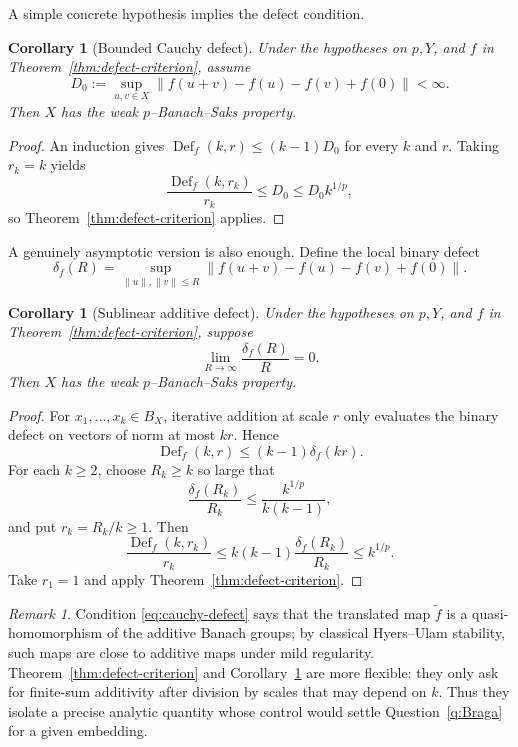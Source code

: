 \documentclass[11pt]{amsart}
\newtheorem{corollary}[theorem]{Corollary}
\theoremstyle{definition}
\theoremstyle{remark}
\newtheorem{remark}[theorem]{Remark}
\newcommand{\Def}{\mathop{\mathrm{Def}}}
\newcommand{\norm}[1]{\left\lVert #1\right\rVert}
\begin{document}
A simple concrete hypothesis implies the defect condition.

\begin{corollary}[Bounded Cauchy defect]\label{cor:bounded-defect}
Under the hypotheses on $p,Y$, and $f$ in Theorem~\ref{thm:defect-criterion}, assume
\begin{equation}\label{eq:cauchy-defect}
 D_0:=\sup_{u,v\in X}
 \norm{f(u+v)-f(u)-f(v)+f(0)}<\infty.
\end{equation}
Then $X$ has the weak $p$--Banach--Saks property.
\end{corollary}

\begin{proof}
An induction gives $\Def_f(k,r)\le(k-1)D_0$ for every $k$ and $r$.  Taking $r_k=k$ yields
\[
 \frac{\Def_f(k,r_k)}{r_k}\le D_0\le D_0k^{1/p},
\]
so Theorem~\ref{thm:defect-criterion} applies.
\end{proof}

A genuinely asymptotic version is also enough.  Define the local binary defect
\[
 \delta_f(R)=\sup_{\norm{u},\norm{v}\le R}
 \norm{f(u+v)-f(u)-f(v)+f(0)}.
\]

\begin{corollary}[Sublinear additive defect]\label{cor:sublinear-defect}
Under the hypotheses on $p,Y$, and $f$ in Theorem~\ref{thm:defect-criterion}, suppose
\[
 \lim_{R\to\infty}\frac{\delta_f(R)}{R}=0.
\]
Then $X$ has the weak $p$--Banach--Saks property.
\end{corollary}

\begin{proof}
For $x_1,\ldots,x_k\in B_X$, iterative addition at scale $r$ only evaluates the binary defect on vectors of norm at most $kr$.  Hence
\[
 \Def_f(k,r)\le(k-1)\delta_f(kr).
\]
For each $k\ge2$, choose $R_k\ge k$ so large that
\[
 \frac{\delta_f(R_k)}{R_k}\le\frac{k^{1/p}}{k(k-1)},
\]
and put $r_k=R_k/k\ge1$.  Then
\[
 \frac{\Def_f(k,r_k)}{r_k}
 \le k(k-1)\frac{\delta_f(R_k)}{R_k}
 \le k^{1/p}.
\]
Take $r_1=1$ and apply Theorem~\ref{thm:defect-criterion}.
\end{proof}

\begin{remark}
Condition \eqref{eq:cauchy-defect} says that the translated map $\widetilde f$ is a quasi-homomorphism of the additive Banach groups; by classical Hyers--Ulam stability, such maps are close to additive maps under mild regularity.  Theorem~\ref{thm:defect-criterion} and Corollary~\ref{cor:sublinear-defect} are more flexible: they only ask for finite-sum additivity after division by scales that may depend on $k$.  Thus they isolate a precise analytic quantity whose control would settle Question~\ref{q:Braga} for a given embedding.
\end{remark}
\end{document}
